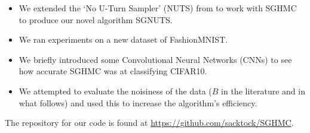 \begin{itemize}
    \item We extended the `No U-Turn Sampler' (NUTS) from \cite{nuts} to work with SGHMC to produce our novel algorithm SGNUTS.
    \item We ran experiments on a new dataset of FashionMNIST.
    \item We briefly introduced some Convolutional Neural Networks (CNNs) to see how accurate SGHMC was at classifying CIFAR10.
    \item We attempted to evaluate the noisiness of the data ($B$ in the literature and in what follows) and used this to increase the algorithm's efficiency.
\end{itemize}

The repository for our code is found at \url{https://github.com/sacktock/SGHMC}.
